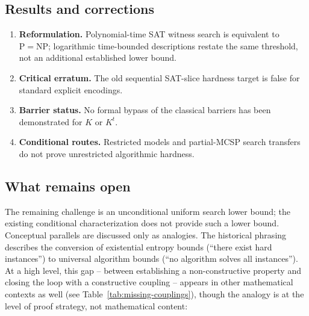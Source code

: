 \documentclass[aps,prd,twocolumn,superscriptaddress,nofootinbib]{revtex4-2}
\theoremstyle{definition}
\theoremstyle{remark}
\newcommand{\NP}{\mathrm{NP}}
\newcommand{\PP}{\mathrm{P}}
\begin{document}
\subsection{Results and corrections}
\begin{enumerate}
\item \textbf{Reformulation.} Polynomial-time SAT witness search is
equivalent to $\PP=\NP$; logarithmic time-bounded descriptions restate
the same threshold, not an additional established lower bound.
\item \textbf{Critical erratum.} The old sequential SAT-slice
hardness target is false for standard explicit encodings.
\item \textbf{Barrier status.} No formal bypass of the classical
barriers has been demonstrated for $K$ or $K^t$.
\item \textbf{Conditional routes.} Restricted models and partial-MCSP
search transfers do not prove unrestricted algorithmic hardness.
\end{enumerate}

\subsection{What remains open}

The remaining challenge is an unconditional uniform search lower bound; the existing conditional characterization does not provide such a lower bound. Conceptual parallels are discussed only as analogies. The historical phrasing describes the conversion of existential entropy bounds (``there exist hard instances'') to universal algorithm bounds (``no algorithm solves all instances''). At a high level, this gap -- between establishing a non-constructive property and closing the loop with a constructive coupling -- appears in other mathematical contexts as well (see Table~\ref{tab:missing-couplings}), though the analogy is at the level of proof strategy, not mathematical content:

\begin{table}[htbp]
\caption{Structural analogy of non-negative quantities and missing couplings across mathematical and complexity problems.}
\label{tab:missing-couplings}
\centering
{}
\end{table}
\end{document}
